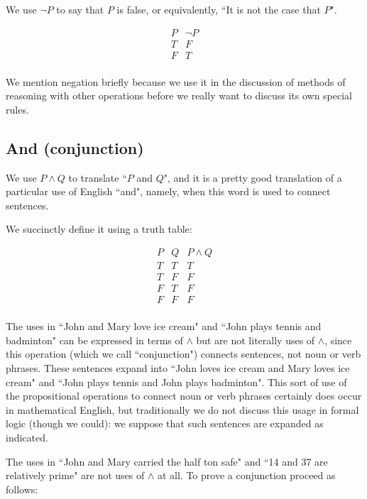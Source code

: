 \documentclass[12pt]{article}
\begin{document}
We use $\neg P$ to say that $P$ is false, or equivalently, ``It is not the case that $P$".

$$\begin{array}{c|c}

P & \neg P \\ \hline
T & F \\
F & T \\
\end{array}$$

We mention negation briefly because we use it in the discussion of methods of reasoning with other operations before we really want to discuss its own special rules.

\subsection{And (conjunction)}

We use $P \wedge Q$ to translate ``$P$ and $Q$", and it is a pretty good translation of a particular use of English ``and", namely, when this word is used to connect sentences.

We succinctly define it using a truth table:

$$\begin{array}{cc|c}
P & Q & P \wedge Q \\ \hline
T & T & T \\
T & F & F \\
F & T & F \\
F & F & F \\
\end{array}$$

The uses in ``John and Mary love ice cream" and ``John plays tennis and badminton" can be expressed in terms of $\wedge$ but are not literally uses of $\wedge$, since this operation (which we call ``conjunction") connects sentences, not noun or verb phrases.  These sentences expand into ``John loves ice cream and Mary loves ice cream" and ``John plays tennis and John plays badminton".  This sort of use of the propositional operations to connect noun or verb phrases certainly does occur in mathematical English, but traditionally we do not discuss this usage in formal logic (though we could):  we suppose that such sentences are expanded as indicated.

The uses in ``John and Mary carried the half ton safe" and ``14 and 37 are relatively prime" are not uses of $\wedge$ at all.
\newpage
To prove a conjunction proceed as follows:
\end{document}
